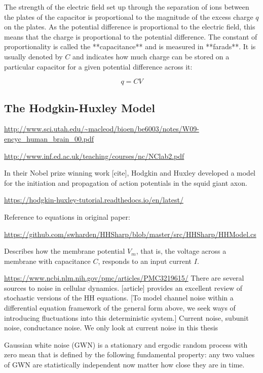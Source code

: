 The strength of the electric field set up through the separation of ions between the plates of the capacitor is proportional to the magnitude of the excess charge $q$ on the plates. As the potential difference is proportional to the electric field, this means that the charge is proportional to the potential difference. The constant of proportionality is called the **capacitance** and is measured in **farads**. It is usually denoted by $C$ and indicates how much charge can be stored on a particular capacitor for a given potential difference across it:

$$ q = C V $$


\subsection{The Hodgkin-Huxley Model}\label{sec:hh}

\url{http://www.sci.utah.edu/~macleod/bioen/be6003/notes/W09-encyc_human_brain_00.pdf}

\url{http://www.inf.ed.ac.uk/teaching/courses/nc/NClab2.pdf}

In their Nobel prize winning work [cite], Hodgkin and Huxley developed a model for the initiation and propagation of action potentials in the squid giant axon. 

\url{https://hodgkin-huxley-tutorial.readthedocs.io/en/latest/}

Reference to equations in original paper: 

\url{https://github.com/swharden/HHSharp/blob/master/src/HHSharp/HHModel.cs}

Describes how the membrane potential $V_m$, that is, the voltage across a membrane with capacitance $C$, responds to an input current $I$.


\url{https://www.ncbi.nlm.nih.gov/pmc/articles/PMC3219615/}
There are several sources to noise in cellular dynamics. [article] provides an excellent review of stochastic versions of the HH equations. [To model channel noise within a differential equation framework of the general form above, we seek ways of introducing fluctuations into this deterministic system.] Current noise, subunit noise, conductance noise. We only look at current noise in this thesis

Gaussian white noise (GWN) is a stationary and ergodic random process with zero mean that is defined by the following fundamental property: any two values of GWN are statistically independent now matter how close they are in time. 

